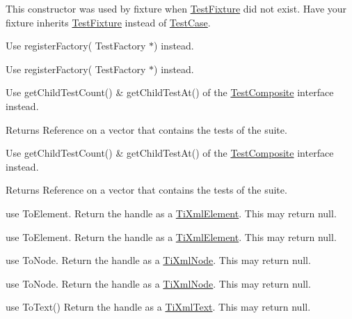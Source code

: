 \begin{DoxyRefList}
This constructor was used by fixture when \hyperlink{class_test_fixture}{Test\+Fixture} did not exist. Have your fixture inherits \hyperlink{class_test_fixture}{Test\+Fixture} instead of \hyperlink{class_test_case}{Test\+Case}.


\item[\label{deprecated__deprecated000006}%
\hypertarget{deprecated__deprecated000006}{}%
Member \hyperlink{class_test_factory_registry_aff8d8215ec83fbb77d46706264e2f161}{Test\+Factory\+Registry\+:\+:register\+Factory} (const std\+::string \&name, \hyperlink{class_test_factory}{Test\+Factory} $\ast$factory)]Use register\+Factory( Test\+Factory $\ast$) instead. 

Use register\+Factory( Test\+Factory $\ast$) instead.  
\item[\label{deprecated__deprecated000007}%
\hypertarget{deprecated__deprecated000007}{}%
Member \hyperlink{class_test_suite_a3205640eefd9694b2a7f2f2ec058af50}{Test\+Suite\+:\+:get\+Tests} () const ]Use get\+Child\+Test\+Count() \& get\+Child\+Test\+At() of the \hyperlink{class_test_composite}{Test\+Composite} interface instead. \begin{DoxyReturn}{Returns}
Reference on a vector that contains the tests of the suite. 
\end{DoxyReturn}
Use get\+Child\+Test\+Count() \& get\+Child\+Test\+At() of the \hyperlink{class_test_composite}{Test\+Composite} interface instead. \begin{DoxyReturn}{Returns}
Reference on a vector that contains the tests of the suite.  
\end{DoxyReturn}

\item[\label{deprecated__deprecated000012}%
\hypertarget{deprecated__deprecated000012}{}%
Member \hyperlink{class_ti_xml_handle_acb5fe8388a526289ea65e817a51e05e7}{Ti\+Xml\+Handle\+:\+:Element} () const ]use To\+Element. Return the handle as a \hyperlink{class_ti_xml_element}{Ti\+Xml\+Element}. This may return null. 

use To\+Element. Return the handle as a \hyperlink{class_ti_xml_element}{Ti\+Xml\+Element}. This may return null.  
\item[\label{deprecated__deprecated000011}%
\hypertarget{deprecated__deprecated000011}{}%
Member \hyperlink{class_ti_xml_handle_ab44b723a8dc9af72838a303c079d0376}{Ti\+Xml\+Handle\+:\+:Node} () const ]use To\+Node. Return the handle as a \hyperlink{class_ti_xml_node}{Ti\+Xml\+Node}. This may return null. 

use To\+Node. Return the handle as a \hyperlink{class_ti_xml_node}{Ti\+Xml\+Node}. This may return null.  
\item[\label{deprecated__deprecated000013}%
\hypertarget{deprecated__deprecated000013}{}%
Member \hyperlink{class_ti_xml_handle_a9fc739c8a18d160006f82572fc143d13}{Ti\+Xml\+Handle\+:\+:Text} () const ]use To\+Text() Return the handle as a \hyperlink{class_ti_xml_text}{Ti\+Xml\+Text}. This may return null. 


\end{DoxyRefList}
